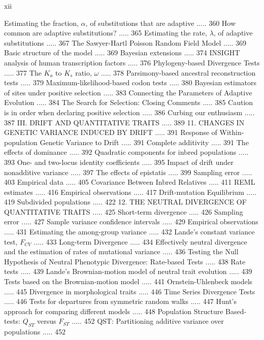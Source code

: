 \documentclass{article}
\begin{document}
xii

Estimating the fraction,  $ \alpha $, of substitutions that are adaptive ..... 360
How common are adaptive substitutions? ..... 365
Estimating the rate,  $ \lambda $, of adaptive substitutions ..... 367
The Sawyer-Hartl Poisson Random Field Model ..... 369
Basic structure of the model ..... 369
Bayesian extensions ..... 374
INSIGHT analysis of human transcription factors ..... 376
Phylogeny-based Divergence Tests ..... 377
The  $ K_{a} $ to  $ K_{s} $ ratio,  $ \omega $ ..... 378
Parsimony-based ancestral reconstruction tests ..... 379
Maximum-likelihood-based codon tests ..... 380
Bayesian estimators of sites under positive selection ..... 383
Connecting the Parameters of Adaptive Evolution ..... 384
The Search for Selection: Closing Comments ..... 385
Caution is in order when declaring positive selection ..... 386
Curbing our enthusiasm ..... 387
III. DRIFT AND QUANTITATIVE TRAITS ..... 389
11. CHANGES IN GENETIC VARIANCE INDUCED BY DRIFT ..... 391
Response of Within-population Genetic Variance to Drift ..... 391
Complete additivity ..... 391
The effects of dominance ..... 392
Quadratic components for inbred populations ..... 393
One- and two-locus identity coefficients ..... 395
Impact of drift under nonadditive variance ..... 397
The effects of epistatis ..... 399
Sampling error ..... 403
Empirical data ..... 405
Covariance Between Inbred Relatives ..... 411
REML estimates ..... 416
Empirical observations ..... 417
Drift-mutation Equilibrium ..... 419
Subdivided populations ..... 422
12. THE NEUTRAL DIVERGENCE OF QUANTITATIVE TRAITS ..... 425
Short-term divergence ..... 426
Sampling error ..... 427
Sample variance confidence intervals ..... 429
Empirical observations ..... 431
Estimating the among-group variance ..... 432
Lande's constant variance test,  $ F_{CV} $ ..... 433
Long-term Divergence ..... 434
Effectively neutral divergence and the estimation of rates of mutational variance ..... 436
Testing the Null Hypothesis of Neutral Phenotypic Divergence: Rate-based Tests ..... 438
Rate tests ..... 439
Lande's Brownian-motion model of neutral trait evolution ..... 439
Tests based on the Brownian-motion model ..... 441
Ornstein-Uhlenbeck models ..... 445
Divergence in morphological traits ..... 446
Time Series Divergence Tests ..... 446
Tests for departures from symmetric random walks ..... 447
Hunt's approach for comparing different models ..... 448
Population Structure Based-tests:  $ Q_{ST} $ versus  $ F_{ST} $ ..... 452
QST: Partitioning additive variance over populations ..... 452
\end{document}
